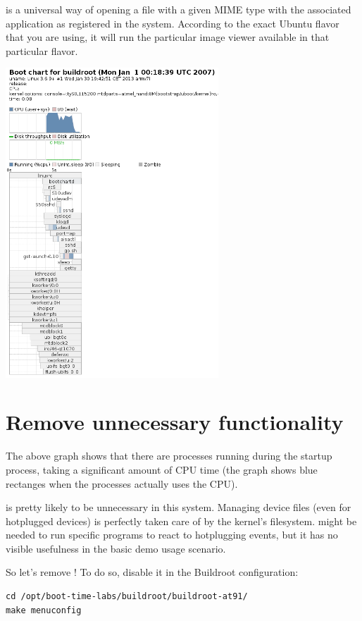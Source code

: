  is a universal way of opening a file with a given MIME
type with the associated application as registered in the system.
According to the exact Ubuntu flavor that you are using,
it will run the particular image viewer available in that
particular flavor.

\begin{center}
\includegraphics[width=8cm]{labs/boottime-init-scripts/bootlog.png}
\end{center}

\section{Remove unnecessary functionality}

The above graph shows that there are  processes running
during the startup process, taking a significant amount of CPU time
(the graph shows blue rectanges when the processes actually uses
the CPU).

 is pretty likely to be unnecessary in this system. Managing
device files (even for hotplugged devices) is perfectly taken care
of by the kernel's  filesystem.  might be
needed to run specific programs to react to hotplugging events, but
it has no visible usefulness in the basic demo usage scenario.

So let's remove ! To do so, disable it in the Buildroot
configuration:

\begin{verbatim}
cd /opt/boot-time-labs/buildroot/buildroot-at91/
make menuconfig
\end{verbatim}

